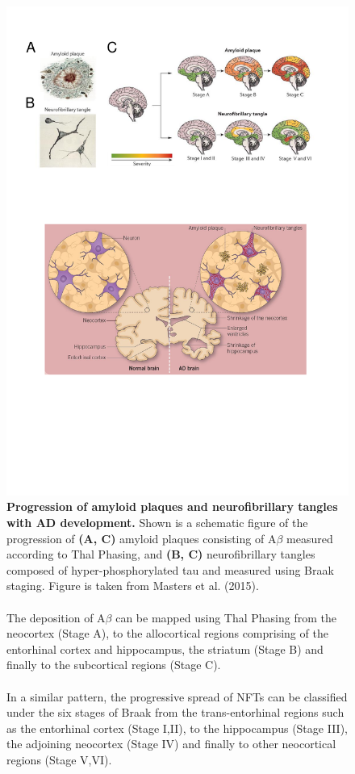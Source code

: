 \begin{figure}[!htp]
	\centering
	\includegraphics[page=1,trim={0 19cm 0cm 0cm},clip, scale = 0.8]{Figures/Introduction_Figures.pdf}
	\captionsetup{width=0.95\textwidth,singlelinecheck=off}
	\caption[Progression of amyloid plaques and neurofibrillary tangles with AD development]%
	{\textbf{Progression of amyloid plaques and neurofibrillary tangles with AD development.} Shown is a schematic figure of the progression of \textbf{(A, C)} amyloid plaques consisting of A$\beta$ measured according to Thal Phasing\cite{DR2002}, and \textbf{(B, C)} neurofibrillary tangles composed of hyper-phosphorylated tau and measured using Braak staging\cite{H1991}. Figure is taken from Masters et al. (2015)\cite{Masters2015}. 
	\\
	\\ 
	The deposition of A$\beta$ can be mapped using Thal Phasing from the neocortex (Stage A), to the allocortical regions comprising of the entorhinal cortex and hippocampus, the striatum (Stage B) and finally to the subcortical regions (Stage C)\cite{DR2002}. 
	\\
	\\
	In a similar pattern, the progressive spread of NFTs can be classified under the six stages of Braak from the trans-entorhinal regions such as the entorhinal cortex (Stage I,II), to the hippocampus (Stage III), the adjoining neocortex (Stage IV) and finally to other neocortical regions (Stage V,VI)\cite{H1991}. 	
	}
	\label{fig:AD_development}
\end{figure}

